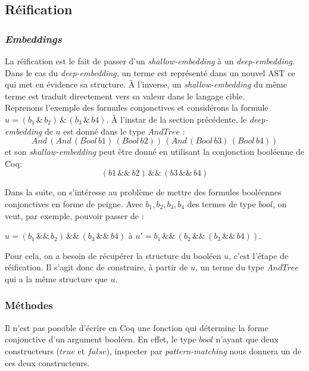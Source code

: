 \documentclass[11pt]{article}
\begin{document}
\subsection{Réification} \label{reification}

\subsubsection{\textit{Embeddings}}

La réification est le fait de passer d'un \textit{shallow-embedding} à un \textit{deep-embedding}. \\

Dans le cas du \textit{deep-embedding}, un terme est représenté dans un nouvel AST ce qui met en évidence sa structure. À l'inverse, un \textit{shallow-embedding} du même terme est traduit directement vers sa valeur dans le langage cible. \\

Reprenons l'exemple des formules conjonctives et considérons la formule $ u = (b_1 \,\&\, b_2) \,\&\, (b_3 \,\&\, b4)$. À l'instar de la section précédente, le \textit{deep-embedding} de $u$ est donné dans le type $AndTree$ :
\[And\,(And\,(Bool\,b1)\,(Bool\,b2))\,(And\,(Bool\,b3)\,(Bool\,b4))\] 
et son \textit{shallow-embedding} peut être donné en utilisant la conjonction booléenne de Coq: 
\[(b1\,\&\&\,b2)\,\&\&\,(b3\,\&\&\,b4) \]

Dans la suite, on s'intéresse au problème de mettre des formules booléennes conjonctives en forme de peigne. Avec $b_1, b_2, b_3, b_4$ des termes de type $bool$, on veut, par exemple, pouvoir passer de : 
\begin{center}
$ u = (b_1 \,\&\&\, b_2) \,\&\&\, (b_3 \,\&\&\, b4)$ \hspace{1cm} à   \hspace{1cm}  $u' = b_1 \,\&\&\, (b_2 \,\&\&\, (b_3 \,\&\&\, b4)). $
\end{center}

Pour cela, on a besoin de récupérer la structure du booléen $u$, c'est l'étape de réification. Il s'agit donc de construire, à partir de $u$, un terme du type $AndTree$ qui a la même structure que $u$.

\subsubsection{Méthodes}

Il n'est pas possible d'écrire en Coq une fonction qui détermine la forme conjonctive d'un argument booléen. En effet, le type $bool$ n'ayant que deux constructeurs ($true$ et $false$), inspecter par \textit{pattern-matching} nous donnera un de ces deux constructeurs.\\
\end{document}
